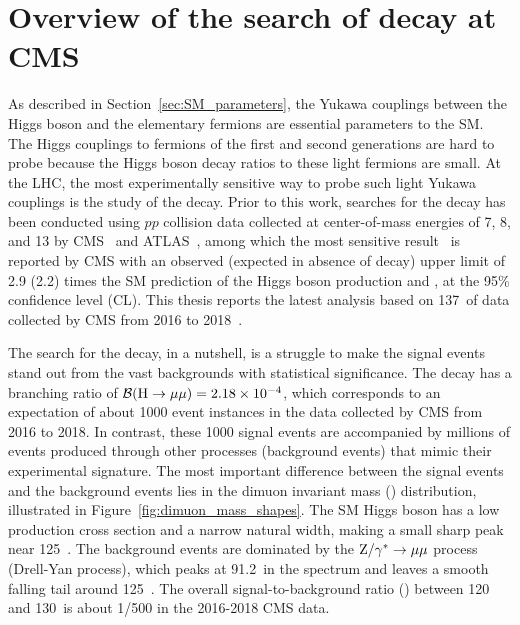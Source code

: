 \chapter{Overview of the search of \texorpdfstring{\hmm}{H to muons} decay at CMS}\label{chp:hmm_overview}

As described in Section~\ref{sec:SM_parameters}, the Yukawa couplings between the Higgs boson and the elementary fermions are essential parameters to the SM.
The Higgs couplings to fermions of the first and second generations are hard to probe because the Higgs boson decay ratios to these light fermions are small.
At the LHC, the most experimentally sensitive way to probe such light Yukawa couplings is the study of the \hmm decay.
Prior to this work, searches for the \hmm decay has been conducted using $pp$ collision data collected at center-of-mass energies of 7, 8, and 13 \TeV
by CMS~\cite{2015184, PhysRevLett.122.021801} and ATLAS~\cite{201468, PhysRevLett.119.051802, Aad:2020xfq},
among which the most sensitive result~\cite{PhysRevLett.122.021801} is reported by CMS with an observed (expected in absence of \hmm decay) upper limit of 2.9 (2.2) times the 
SM prediction of the Higgs boson production and \brhmm, at the 95\% confidence level (CL).
This thesis reports the latest \hmm analysis based on 137~\invfb of data collected by CMS from 2016 to 2018~\cite{Sirunyan_2021}.

The search for the \hmm decay, in a nutshell, is a struggle to make the signal events stand out from the vast backgrounds with statistical significance.
The \hmm decay has a branching ratio of ${{\mathcal{B}(\mathrm{H} \to \mu\mu)} = 2.18 \times 10^{-4}}$, 
which corresponds to an expectation of about 1000 event instances in the data collected by CMS from 2016 to 2018.
In contrast, these 1000 signal events are accompanied by millions of events produced through other processes (background events) that mimic their experimental signature.
The most important difference between the signal events and the background events lies in the dimuon invariant mass (\mmm) distribution, illustrated in Figure~\ref{fig:dimuon_mass_shapes}.
The SM Higgs boson has a low production cross section and a narrow natural width, making a small sharp peak near 125~\GeV.
The background events are dominated by the $\mathrm{Z}/\gamma^{*} \to \mu\mu$ process (Drell-Yan process), 
which peaks at 91.2~\GeV in the \mmm spectrum and leaves a smooth falling tail around 125~\GeV.
The overall signal-to-background ratio (\SoB) between 120 and 130~\GeV is about 1/500 in the 2016-2018 CMS data.

